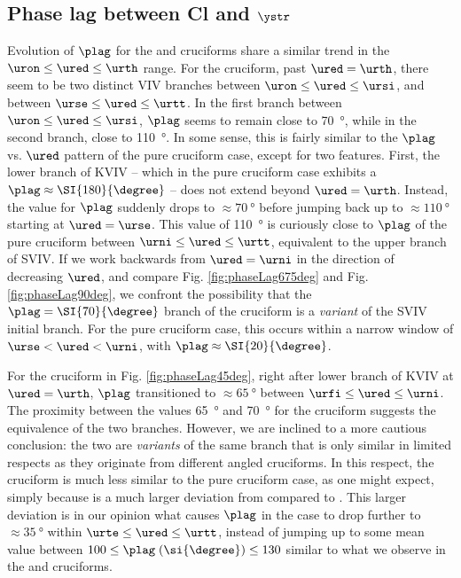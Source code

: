 \documentclass[a4paper,fleqn]{cas-sc}
\begin{document}
\subsection{Phase lag between Cl and $\ystr$} \label{ssec:phaseLag67545}
Evolution of $\plag$ for the \angfo{} and \angth{} cruciforms share a similar trend in the $\uron \leq \ured \leq \urth$ range. For the \angfo{} cruciform, past $\ured = \urth$, there seem to be two distinct VIV branches between $\uron \leq \ured \leq \ursi$, and between $\urse \leq \ured \leq \urtt$. In the first branch between $\uron \leq \ured \leq \ursi$, $\plag$ seems to remain close to \SI{70}{\degree}, while in the second branch, close to \SI{110}{\degree}. In some sense, this is fairly similar to the $\plag$ vs. $\ured$ pattern of the pure cruciform case, except for two features. First, the lower branch of KVIV -- which in the pure cruciform case exhibits a $\plag \approx \SI{180}{\degree}$ -- does not extend beyond $\ured = \urth$. Instead, the value for $\plag$ suddenly drops to $\approx \SI{70}{\degree}$ before jumping back up to $\approx \SI{110}{\degree}$ starting at $\ured = \urse$. This value of \SI{110}{\degree} is curiously close to $\plag$ of the pure cruciform between $\urni \leq \ured \leq \urtt$, equivalent to the upper branch of SVIV. If we work backwards from $\ured = \urni$ in the direction of decreasing $\ured$, and compare Fig. \ref{fig:phaseLag675deg} and Fig. \ref{fig:phaseLag90deg}, we confront the possibility that the $\plag = \SI{70}{\degree}$ branch of the \angfo cruciform is a \textit{variant} of the SVIV initial branch. For the pure cruciform case, this occurs within a narrow window of $\urse < \ured < \urni$, with $\plag \approx \SI{20}{\degree}$.

For the \angth{} cruciform in Fig. \ref{fig:phaseLag45deg}, right after lower branch of KVIV at $\ured = \urth$, $\plag$ transitioned to $\approx \SI{65}{\degree}$ between $\urfi \leq \ured \leq \urni$. The proximity between the values \SI{65}{\degree} and \SI{70}{\degree} for the \angfo{} cruciform suggests the equivalence of the two branches. However, we are inclined to a more cautious conclusion: the two are \textit{variants} of the same branch that is only similar in limited respects as they originate from different angled cruciforms. In this respect, the \angth{} cruciform is much less similar to the pure cruciform case, as one might expect, simply because \angth{} is a much larger deviation from \angfi{} compared to \angfo{}. This larger deviation is in our opinion what causes $\plag$ in the \angth{} case to drop further to $\approx \SI{35}{\degree}$ within $\urte \leq \ured \leq \urtt$, instead of jumping up to some mean value between $100 \leq \plag \; (\si{\degree}) \leq 130$ similar to what we observe in the \angfi{} and \angfo{} cruciforms.
\end{document}
